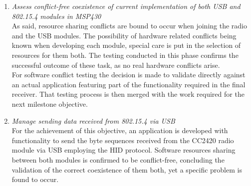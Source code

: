 		\begin{enumerate}
		\item\emph{Assess conflict-free coexistence of current implementation of both USB and 802.15.4 modules in MSP430}\\

		As said, resource sharing conflicts are bound to occur when joining the radio and the USB modules. The possibility of hardware related conflicts being known when developing each module, special care is put in the selection of resources for them both. The testing conducted in this phase confirms the successful outcome of these task, as no real hardware conflicts arise.\\

		For software conflict testing the decision is made to validate directly against an actual application featuring part of the functionality required in the final receiver. That testing process is then merged with the work required for the next milestone objective.\\


		\item\emph{Manage sending data received from 802.15.4 via USB}\\

			For the achievement of this objective, an application is developed with functionality to send the byte sequences received from the CC2420 radio module via USB employing the HID protocol. Software resources sharing between both modules is confirmed to be conflict-free, concluding the validation of the correct coexistence of them both, yet a specific problem is found to occur.\\


\end{enumerate}
